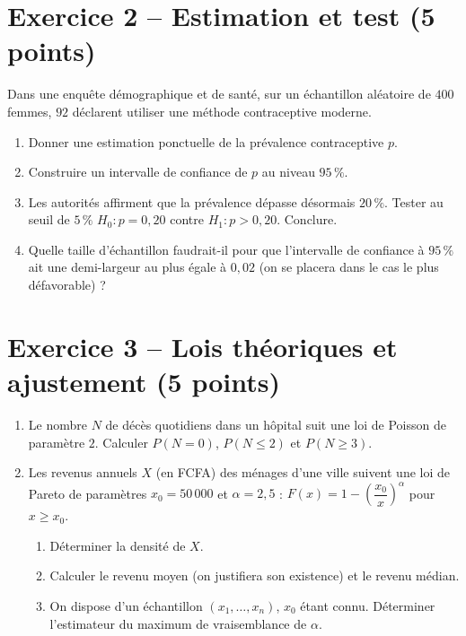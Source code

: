 \documentclass[11pt,a4paper]{article}
\begin{document}
\section*{Exercice 2 -- Estimation et test (5 points)}
Dans une enquête démographique et de santé, sur un échantillon aléatoire de $400$ femmes,
$92$ déclarent utiliser une méthode contraceptive moderne.
\begin{enumerate}
  \item Donner une estimation ponctuelle de la prévalence contraceptive $p$.
  \item Construire un intervalle de confiance de $p$ au niveau $95\,\%$.
  \item Les autorités affirment que la prévalence dépasse désormais $20\,\%$. Tester au seuil de $5\,\%$
  $H_0 : p = 0{,}20$ contre $H_1 : p > 0{,}20$. Conclure.
  \item Quelle taille d'échantillon faudrait-il pour que l'intervalle de confiance à $95\,\%$ ait une demi-largeur au plus égale à $0{,}02$ (on se placera dans le cas le plus défavorable) ?
\end{enumerate}

\section*{Exercice 3 -- Lois théoriques et ajustement (5 points)}
\begin{enumerate}
  \item Le nombre $N$ de décès quotidiens dans un hôpital suit une loi de Poisson de paramètre $2$.
  Calculer $P(N = 0)$, $P(N \leqslant 2)$ et $P(N \geqslant 3)$.
  \item Les revenus annuels $X$ (en FCFA) des ménages d'une ville suivent une loi de Pareto de
  paramètres $x_0 = 50\,000$ et $\alpha = 2{,}5$ : $F(x) = 1 - \left(\dfrac{x_0}{x}\right)^{\alpha}$ pour $x \geqslant x_0$.
  \begin{enumerate}[label=\alph*)]
    \item Déterminer la densité de $X$.
    \item Calculer le revenu moyen (on justifiera son existence) et le revenu médian.
    \item On dispose d'un échantillon $(x_1,\dots,x_n)$, $x_0$ étant connu. Déterminer l'estimateur du
    maximum de vraisemblance de $\alpha$.
  \end{enumerate}
\end{enumerate}
\end{document}
